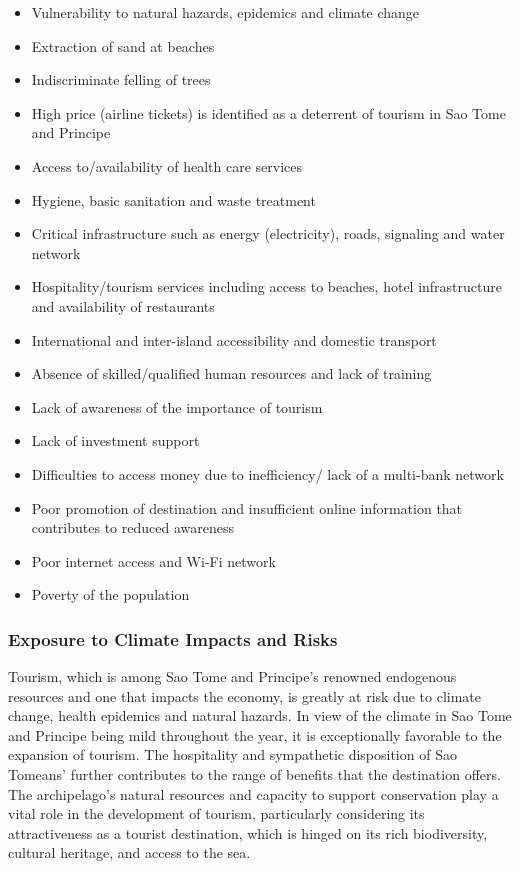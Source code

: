 \documentclass[
]{book}
\providecommand{\tightlist}{%
  \setlength{\itemsep}{0pt}\setlength{\parskip}{0pt}}
\begin{document}
\begin{itemize}
\tightlist
\item
  Vulnerability to natural hazards, epidemics and climate change
\item
  Extraction of sand at beaches
\item
  Indiscriminate felling of trees
\item
  High price (airline tickets) is identified as a deterrent of tourism in Sao Tome and Principe
\item
  Access to/availability of health care services
\item
  Hygiene, basic sanitation and waste treatment
\item
  Critical infrastructure such as energy (electricity), roads, signaling and water network
\item
  Hospitality/tourism services including access to beaches, hotel infrastructure and availability of restaurants
\item
  International and inter-island accessibility and domestic transport
\item
  Absence of skilled/qualified human resources and lack of training
\item
  Lack of awareness of the importance of tourism
\item
  Lack of investment support
\item
  Difficulties to access money due to inefficiency/ lack of a multi-bank network
\item
  Poor promotion of destination and insufficient online information that contributes to reduced awareness
\item
  Poor internet access and Wi-Fi network
\item
  Poverty of the population
\end{itemize}

\hypertarget{exposure-to-climate-impacts-and-risks-12}{%
\subsubsection{Exposure to Climate Impacts and Risks}\label{exposure-to-climate-impacts-and-risks-12}}

Tourism, which is among Sao Tome and Principe's renowned endogenous resources and one that impacts the economy, is greatly at risk due to climate change, health epidemics and natural hazards. In view of the climate in Sao Tome and Principe being mild throughout the year, it is exceptionally favorable to the expansion of tourism. The hospitality and sympathetic disposition of Sao Tomeans' further contributes to the range of benefits that the destination offers. The archipelago's natural resources and capacity to support conservation play a vital role in the development of tourism, particularly considering its attractiveness as a tourist destination, which is hinged on its rich biodiversity, cultural heritage, and access to the sea.
\end{document}

